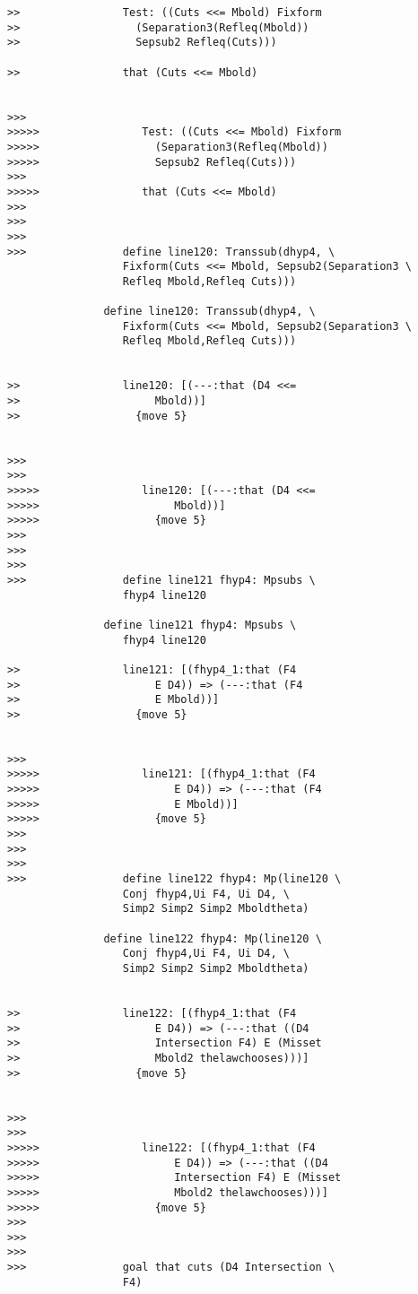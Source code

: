 \documentclass[12pt]{article}
\begin{document}
\begin{verbatim}
>>                Test: ((Cuts <<= Mbold) Fixform
>>                  (Separation3(Refleq(Mbold))
>>                  Sepsub2 Refleq(Cuts)))

>>                that (Cuts <<= Mbold)


>>>
>>>>>                Test: ((Cuts <<= Mbold) Fixform
>>>>>                  (Separation3(Refleq(Mbold))
>>>>>                  Sepsub2 Refleq(Cuts)))
>>>
>>>>>                that (Cuts <<= Mbold)
>>>
>>>
>>>
>>>               define line120: Transsub(dhyp4, \
                  Fixform(Cuts <<= Mbold, Sepsub2(Separation3 \
                  Refleq Mbold,Refleq Cuts)))

               define line120: Transsub(dhyp4, \
                  Fixform(Cuts <<= Mbold, Sepsub2(Separation3 \
                  Refleq Mbold,Refleq Cuts)))


>>                line120: [(---:that (D4 <<=
>>                     Mbold))]
>>                  {move 5}


>>>
>>>
>>>>>                line120: [(---:that (D4 <<=
>>>>>                     Mbold))]
>>>>>                  {move 5}
>>>
>>>
>>>
>>>               define line121 fhyp4: Mpsubs \
                  fhyp4 line120

               define line121 fhyp4: Mpsubs \
                  fhyp4 line120

>>                line121: [(fhyp4_1:that (F4
>>                     E D4)) => (---:that (F4
>>                     E Mbold))]
>>                  {move 5}


>>>
>>>>>                line121: [(fhyp4_1:that (F4
>>>>>                     E D4)) => (---:that (F4
>>>>>                     E Mbold))]
>>>>>                  {move 5}
>>>
>>>
>>>
>>>               define line122 fhyp4: Mp(line120 \
                  Conj fhyp4,Ui F4, Ui D4, \
                  Simp2 Simp2 Simp2 Mboldtheta)

               define line122 fhyp4: Mp(line120 \
                  Conj fhyp4,Ui F4, Ui D4, \
                  Simp2 Simp2 Simp2 Mboldtheta)


>>                line122: [(fhyp4_1:that (F4
>>                     E D4)) => (---:that ((D4
>>                     Intersection F4) E (Misset
>>                     Mbold2 thelawchooses)))]
>>                  {move 5}


>>>
>>>
>>>>>                line122: [(fhyp4_1:that (F4
>>>>>                     E D4)) => (---:that ((D4
>>>>>                     Intersection F4) E (Misset
>>>>>                     Mbold2 thelawchooses)))]
>>>>>                  {move 5}
>>>
>>>
>>>
>>>               goal that cuts (D4 Intersection \
                  F4)


\end{verbatim}
\end{document}
